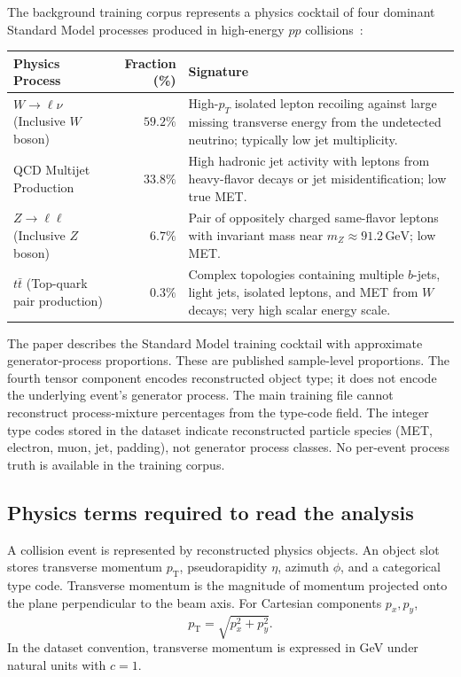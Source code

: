 \documentclass[11pt,a4paper]{article}
\newcommand{\pt}{p_{\mathrm{T}}}
\begin{document}
The background training corpus represents a physics cocktail of four dominant Standard Model processes produced in high-energy $pp$ collisions~\cite{govorkova2022lhc}:

\begin{center}
\small
\begin{tabularx}{\textwidth}{l r X}
\toprule
\textbf{Physics Process} & \textbf{Fraction (\%)} & \textbf{Signature} \\
\midrule
$W \to \ell\nu$ (Inclusive $W$ boson) & $59.2\%$ & High-$p_T$ isolated lepton recoiling against large missing transverse energy from the undetected neutrino; typically low jet multiplicity. \\
QCD Multijet Production & $33.8\%$ & High hadronic jet activity with leptons from heavy-flavor decays or jet misidentification; low true MET. \\
$Z \to \ell\ell$ (Inclusive $Z$ boson) & $6.7\%$ & Pair of oppositely charged same-flavor leptons with invariant mass near $m_Z \approx 91.2\,\text{GeV}$; low MET. \\
$t\bar{t}$ (Top-quark pair production) & $0.3\%$ & Complex topologies containing multiple $b$-jets, light jets, isolated leptons, and MET from $W$ decays; very high scalar energy scale. \\
\bottomrule
\end{tabularx}
\end{center}

The paper describes the Standard Model training cocktail with approximate generator-process proportions. These are published sample-level proportions. The fourth tensor component encodes reconstructed object type; it does not encode the underlying event's generator process. The main training file cannot reconstruct process-mixture percentages from the type-code field. The integer type codes stored in the dataset indicate reconstructed particle species (MET, electron, muon, jet, padding), not generator process classes. No per-event process truth is available in the training corpus.

\subsection{Physics terms required to read the analysis}

A collision event is represented by reconstructed physics objects. An object slot stores transverse momentum \(\pt\), pseudorapidity \(\eta\), azimuth \(\phi\), and a categorical type code. Transverse momentum is the magnitude of momentum projected onto the plane perpendicular to the beam axis. For Cartesian components \(p_x,p_y\),
\begin{equation}\pt=\sqrt{p_x^2+p_y^2}.\label{eq:pt}\end{equation}
In the dataset convention, transverse momentum is expressed in GeV under natural units with \(c=1\).
\end{document}
